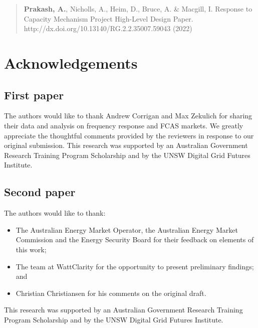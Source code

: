 \documentclass[12pt,a4paper,]{report}
\providecommand{\tightlist}{%
  \setlength{\itemsep}{0pt}\setlength{\parskip}{0pt}}
\begin{document}
\begin{quote}
\textbf{Prakash, A.}, Nicholls, A., Heim, D., Bruce, A. \& Macgill, I.
Response to Capacity Mechanism Project High-Level Design Paper.
http://dx.doi.org/10.13140/RG.2.2.35007.59043 (2022)
\end{quote}

\hypertarget{acknowledgements}{%
\chapter*{Acknowledgements}\label{acknowledgements}}

\hypertarget{first-paper}{%
\section*{First paper}\label{first-paper}}

The authors would like to thank Andrew Corrigan and Max Zekulich for
sharing their data and analysis on frequency response and FCAS markets.
We greatly appreciate the thoughtful comments provided by the reviewers
in response to our original submission. This research was supported by
an Australian Government Research Training Program Scholarship and by
the UNSW Digital Grid Futures Institute.

\hypertarget{second-paper}{%
\section*{Second paper}\label{second-paper}}

The authors would like to thank:

\begin{itemize}
\tightlist
\item
  The Australian Energy Market Operator, the Australian Energy Market
  Commission and the Energy Security Board for their feedback on
  elements of this work;
\item
  The team at WattClarity for the opportunity to present preliminary
  findings; and
\item
  Christian Christiansen for his comments on the original draft.
\end{itemize}

This research was supported by an Australian Government Research
Training Program Scholarship and by the UNSW Digital Grid Futures
Institute.
\end{document}
